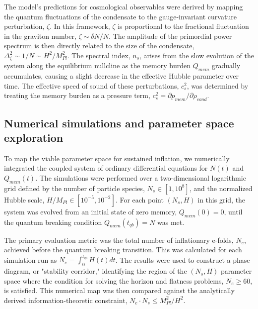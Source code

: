 \documentclass[]{article}
\begin{document}
The model's predictions for cosmological observables were derived by mapping the quantum fluctuations of the condensate to the gauge-invariant curvature perturbation, $\zeta$. In this framework, $\zeta$ is proportional to the fractional fluctuation in the graviton number, $\zeta \sim \delta N/N$. The amplitude of the primordial power spectrum is then directly related to the size of the condensate, $\Delta_\zeta^2 \sim 1/N \sim H^2/M_{Pl}^2$. The spectral index, $n_s$, arises from the slow evolution of the system along the equilibrium nullcline as the memory burden $Q_{mem}$ gradually accumulates, causing a slight decrease in the effective Hubble parameter over time. The effective speed of sound of these perturbations, $c_s^2$, was determined by treating the memory burden as a pressure term, $c_s^2 = \partial p_{mem}/\partial \rho_{cond}$.

\subsection{Numerical simulations and parameter space exploration}
To map the viable parameter space for sustained inflation, we numerically integrated the coupled system of ordinary differential equations for $N(t)$ and $Q_{mem}(t)$. The simulations were performed over a two-dimensional logarithmic grid defined by the number of particle species, $N_s \in [1, 10^8]$, and the normalized Hubble scale, $H/M_{Pl} \in [10^{-5}, 10^{-2}]$. For each point $(N_s, H)$ in this grid, the system was evolved from an initial state of zero memory, $Q_{mem}(0) = 0$, until the quantum breaking condition $Q_{mem}(t_{qb}) = N$ was met.

The primary evaluation metric was the total number of inflationary e-folds, $N_e$, achieved before the quantum breaking transition. This was calculated for each simulation run as $N_e = \int_0^{t_{qb}} H(t) dt$. The results were used to construct a phase diagram, or "stability corridor," identifying the region of the $(N_s, H)$ parameter space where the condition for solving the horizon and flatness problems, $N_e \geq 60$, is satisfied. This numerical map was then compared against the analytically derived information-theoretic constraint, $N_e \cdot N_s \leq M_{Pl}^2/H^2$.
\end{document}

